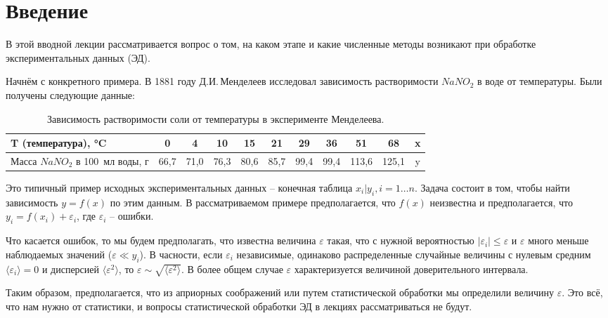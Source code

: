 \section{Введение}
В этой вводной лекции рассматривается вопрос о том, на каком этапе и какие численные методы возникают при обработке экспериментальных данных (ЭД).

Начнём с конкретного примера. В 1881 году Д.И.\,Менделеев исследовал зависимость растворимости $NaNO_{2}$ в воде от температуры. Были получены следующие данные:

\begin{table}[h]
	\small
	\caption{Зависимость растворимости соли от температуры в эксперименте Менделеева.}
	\label{table:mendeleev}
	\begin{tabular}{ p{0.3\width} *{10}{ | c} | }
		\graytable
		\toprule
		T (температура), °C & 0 & 4 & 10 & 15 & 21& 29& 36& 51&68 & x \\
		\midrule
		Масса $NaNO_{2}$ в 100~мл воды, г&
		66,7&71,0&76,3&80,6&85,7&99,4&99,4&113,6&125,1& y \\

		\bottomrule
	\end{tabular}
	
\end{table}

Это типичный пример исходных экспериментальных данных -- конечная таблица $x_i | y_i, i=1\dots n$. Задача состоит в том, чтобы найти зависимость $y = f(x)$ по этим данным. В рассматриваемом примере предполагается, что $f(x)$ неизвестна и предполагается, что $y_i = f(x_i) + \varepsilon _i$, где $\varepsilon _ i$ -- ошибки.

Что касается ошибок, то мы будем предполагать, что известна величина $\varepsilon$ такая, что с нужной вероятностью $|\varepsilon _i| \leq \varepsilon$ и $\varepsilon$ много меньше наблюдаемых значений ($\varepsilon \ll y_i$). В часности, если $\varepsilon_i$ независимые, одинаково распределенные случайные величины с нулевым средним $\langle \varepsilon_i \rangle = 0$ и дисперсией $\langle \varepsilon^2 \rangle$, то $\varepsilon \sim \sqrt{\langle \varepsilon^2 \rangle }$. В более общем случае $\varepsilon$ характеризуется величиной доверительного интервала. 

Таким образом, предполагается, что из априорных соображений или путем статистической обработки мы определили величину $\varepsilon$. Это всё, что нам нужно от статистики, и вопросы статистической обработки ЭД в лекциях рассматриваться не будут.



